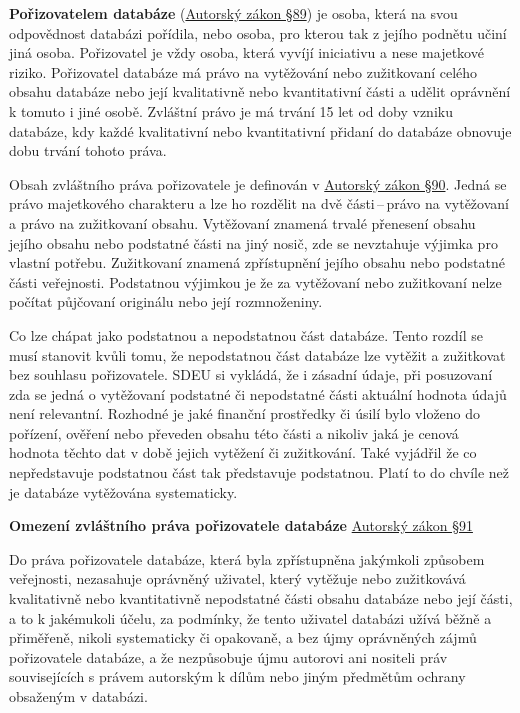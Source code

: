 \textbf{Pořizovatelem databáze} (\href{https://www.zakonyprolidi.cz/cs/2000-121#p89}{Autorský zákon §89}) je osoba, která na svou odpovědnost databázi pořídila, nebo osoba, pro kterou tak z jejího podnětu učiní jiná osoba. Pořizovatel je vždy osoba, která vyvíjí iniciativu a nese majetkové riziko. Pořizovatel databáze má právo na vytěžování nebo zužitkovaní celého obsahu databáze nebo její kvalitativně nebo kvantitativní části a udělit oprávnění k tomuto i jiné osobě. Zvláštní právo je má trvání 15 let od doby vzniku databáze, kdy každé kvalitativní nebo kvantitativní přidaní do databáze obnovuje dobu trvání tohoto práva.

Obsah zvláštního práva pořizovatele je definován v \href{https://www.zakonyprolidi.cz/cs/2000-121#p90}{Autorský zákon §90}. Jedná se právo majetkového charakteru a lze ho rozdělit na dvě části\,--\,právo na vytěžovaní a právo na zužitkovaní obsahu. Vytěžovaní znamená trvalé přenesení obsahu jejího obsahu nebo podstatné části na jiný nosič, zde se nevztahuje výjimka pro vlastní potřebu. Zužitkovaní znamená zpřístupnění jejího obsahu nebo podstatné části veřejnosti. Podstatnou výjimkou je že za vytěžovaní nebo zužitkovaní nelze počítat půjčovaní originálu nebo její rozmnoženiny.

Co lze chápat jako podstatnou a nepodstatnou část databáze. Tento rozdíl se musí stanovit kvůli tomu, že nepodstatnou část databáze lze vytěžit a zužitkovat bez souhlasu pořizovatele. SDEU si vykládá, že i zásadní údaje, při posuzovaní zda se jedná o vytěžovaní podstatné či nepodstatné části aktuální hodnota údajů není relevantní. Rozhodné je jaké finanční prostředky či úsilí bylo vloženo do pořízení, ověření nebo převeden obsahu této části a nikoliv jaká je cenová hodnota těchto dat v době jejich vytěžení či zužitkování. Také vyjádřil že co nepředstavuje podstatnou část tak představuje podstatnou. Platí to do chvíle než je databáze vytěžována systematicky.

\textbf{Omezení zvláštního práva pořizovatele databáze} \href{https://www.zakonyprolidi.cz/cs/2000-121#p91}{Autorský zákon §91}

Do práva pořizovatele databáze, která byla zpřístupněna jakýmkoli způsobem veřejnosti, nezasahuje oprávněný uživatel, který vytěžuje nebo zužitkovává kvalitativně nebo kvantitativně nepodstatné části obsahu databáze nebo její části, a to k jakémukoli účelu, za podmínky, že tento uživatel databázi užívá běžně a přiměřeně, nikoli systematicky či opakovaně, a bez újmy oprávněných zájmů pořizovatele databáze, a že nezpůsobuje újmu autorovi ani nositeli práv souvisejících s právem autorským k dílům nebo jiným předmětům ochrany obsaženým v databázi.

